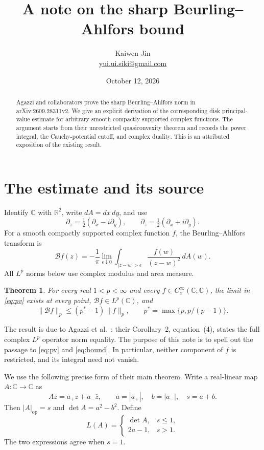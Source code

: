 \documentclass[11pt]{article}
\title{A note on the sharp Beurling--Ahlfors bound}
\author{Kaiwen Jin\\[2pt]\small\href{mailto:yui.ui.siki@gmail.com}{yui.ui.siki@gmail.com}}
\date{October 12, 2026}
\newtheorem{theorem}{Theorem}
\newcommand{\C}{\mathbb C}
\newcommand{\R}{\mathbb R}
\newcommand{\B}{\mathcal B}
\newcommand{\dz}{\partial_z}
\newcommand{\db}{\partial_{\bar z}}
\begin{document}
\maketitle

\begin{abstract}
Agazzi and collaborators prove the sharp Beurling--Ahlfors norm in
arXiv:2609.28311v2. We give an explicit derivation of the corresponding
disk principal-value estimate for arbitrary smooth compactly supported
complex functions. The argument starts from their unrestricted
quasiconvexity theorem and records the power integral, the Cauchy-potential
cutoff, and complex duality. This is an attributed exposition of the
existing result.
\end{abstract}

\section{The estimate and its source}

Identify \(\C\) with \(\R^2\), write \(dA=dx\,dy\), and use
\[
 \dz=\tfrac12(\partial_x-i\partial_y),\qquad
 \db=\tfrac12(\partial_x+i\partial_y).
\]
For a smooth compactly supported complex function \(f\), the
Beurling--Ahlfors transform is
\begin{equation}\label{eq:pv}
 \B f(z)=-\frac1\pi\lim_{\epsilon\downarrow0}
       \int_{|z-w|>\epsilon}\frac{f(w)}{(z-w)^2}\,dA(w).
\end{equation}
All \(L^p\) norms below use complex modulus and area measure.

\begin{theorem}\label{thm:bound}
For every real \(1<p<\infty\) and every \(f\in C_c^\infty(\C;\C)\),
the limit in \eqref{eq:pv} exists at every point, \(\B f\in L^p(\C)\),
and
\begin{equation}\label{eq:bound}
 \|\B f\|_p\le (p^*-1)\|f\|_p,\qquad
 p^*=\max\{p,p/(p-1)\}.
\end{equation}
\end{theorem}

The result is due to Agazzi et al.~\cite{agazzi}: their Corollary~2,
equation~(4), states the full complex \(L^p\) operator norm equality.
The purpose of this note is to spell out the passage to
\eqref{eq:pv} and \eqref{eq:bound}. In particular, neither component of
\(f\) is restricted, and its integral need not vanish.

We use the following precise form of their main theorem. Write a
real-linear map \(A:\C\to\C\) as
\[
 Az=a_+z+a_-\bar z,\qquad a=|a_+|,\quad b=|a_-|,\quad s=a+b.
\]
Then \(|A|_{\mathrm{op}}=s\) and \(\det A=a^2-b^2\). Define
\begin{equation}\label{eq:L}
 L(A)=
 \begin{cases}
   \det A,&s\le1,\\
   2a-1,&s>1 .
 \end{cases}
\end{equation}
The two expressions agree when \(s=1\).
\end{document}

